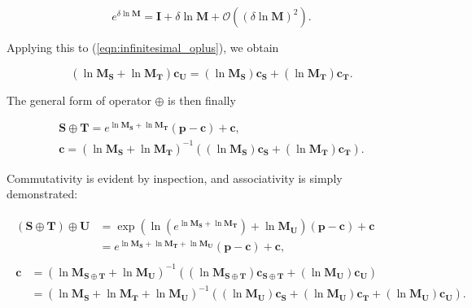         \begin{equation}
          e^{\delta \ln \mathbf{M}} = \mathbf{I} + \delta \ln \mathbf{M} + \mathcal{O}((\delta \ln \mathbf{M})^2).
        \end{equation}
        
        Applying this to (\ref{eqn:infinitesimal_oplus}), we obtain
        
        \begin{equation}
          (\ln\mathbf{M_S} + \ln\mathbf{M_T})\mathbf{c_U} = (\ln\mathbf{M_S})\mathbf{c_S} + (\ln\mathbf{M_T})\mathbf{c_T}.
        \end{equation}
        
        The general form of operator $\oplus$ is then finally
        
        \begin{gather}
          \mathbf{S} \oplus \mathbf{T} = e^{\ln\mathbf{M_S} + \ln\mathbf{M_T}}(\mathbf{p} - \mathbf{c}) + \mathbf{c}, \nonumber \\
          \mathbf{c} = (\ln\mathbf{M_S} + \ln\mathbf{M_T})^{-1}((\ln\mathbf{M_S})\mathbf{c_S} + (\ln\mathbf{M_T})\mathbf{c_T}). \label{eqn:affine_oplus}
        \end{gather}
        
        Commutativity is evident by inspection, and associativity is simply demonstrated:
        
        \begin{gather}
          \begin{split}
            (\mathbf{S} \oplus \mathbf{T}) \oplus \mathbf{U} &= \exp(\ln(e^{\ln\mathbf{M_S} + \ln\mathbf{M_T}}) + \ln\mathbf{M_U})(\mathbf{p} - \mathbf{c}) + \mathbf{c} \\
                                                             &= e^{\ln\mathbf{M_S} + \ln\mathbf{M_T} + \ln\mathbf{M_U}}(\mathbf{p} - \mathbf{c}) + \mathbf{c},
          \end{split} \\
          \begin{split}
            \mathbf{c} &= (\ln\mathbf{M_{S \oplus T}} + \ln\mathbf{M_U})^{-1}((\ln\mathbf{M_{S \oplus T}})\mathbf{c_{S \oplus T}} + (\ln\mathbf{M_U})\mathbf{c_U}) \\
                       &= (\ln\mathbf{M_S} + \ln\mathbf{M_T} + \ln\mathbf{M_U})^{-1}((\ln\mathbf{M_U})\mathbf{c_S} + (\ln\mathbf{M_U})\mathbf{c_T} + (\ln\mathbf{M_U})\mathbf{c_U}).
          \end{split}
        \end{gather}
        
